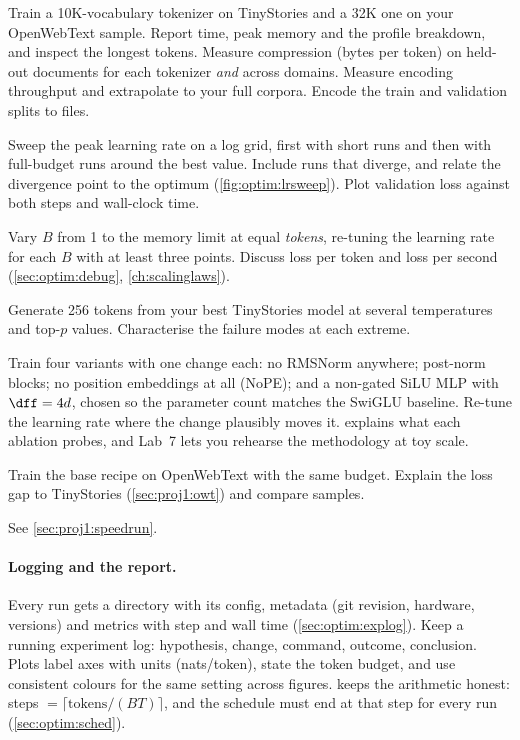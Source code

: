 \begin{description}[leftmargin=1.2em, style=nextline]
  \item[E1: tokenizers.] Train a 10K-vocabulary tokenizer on TinyStories and a 32K one on your
    OpenWebText sample. Report time, peak memory and the profile breakdown, and inspect the longest
    tokens. Measure compression (bytes per token) on held-out documents for each tokenizer
    \emph{and} across domains. Measure encoding throughput and extrapolate to your full corpora.
    Encode the train and validation splits to  files.
  \item[E2: learning rate.] Sweep the peak learning rate on a log grid, first with short runs and
    then with full-budget runs around the best value. Include runs that diverge, and relate the
    divergence point to the optimum (\cref{fig:optim:lrsweep}). Plot validation loss against
    both steps and wall-clock time.
  \item[E3: batch size.] Vary $B$ from 1 to the memory limit at equal \emph{tokens}, re-tuning
    the learning rate for each $B$ with at least three points. Discuss loss per token and loss per
    second (\cref{sec:optim:debug}, \cref{ch:scalinglaws}).
  \item[E4: decoding.] Generate 256 tokens from your best TinyStories model at several
    temperatures and top-$p$ values. Characterise the failure modes at each extreme.
  \item[E5: ablations.] Train four variants with one change each: no RMSNorm anywhere; post-norm
    blocks; no position embeddings at all (NoPE); and a non-gated SiLU MLP with $\dff=4d$, chosen so
    the parameter count matches the SwiGLU baseline. Re-tune the learning rate where the change
    plausibly moves it.  explains what each ablation probes, and Lab~7 lets you
    rehearse the methodology at toy scale.
  \item[E6: web text.] Train the base recipe on OpenWebText with the same budget. Explain the loss
    gap to TinyStories (\cref{sec:proj1:owt}) and compare samples.
  \item[E7: speed run.] See \cref{sec:proj1:speedrun}.
\end{description}

\paragraph{Logging and the report.} Every run gets a directory with its config, metadata (git
revision, hardware, versions) and metrics with step and wall time (\cref{sec:optim:explog}). Keep a
running experiment log: hypothesis, change, command, outcome, conclusion. Plots label axes with
units (nats/token), state the token budget, and use consistent colours for the same setting across
figures.  keeps the arithmetic honest: steps $=\lceil
\text{tokens}/(BT)\rceil$, and the schedule must end at that step for every run
(\cref{sec:optim:sched}).

